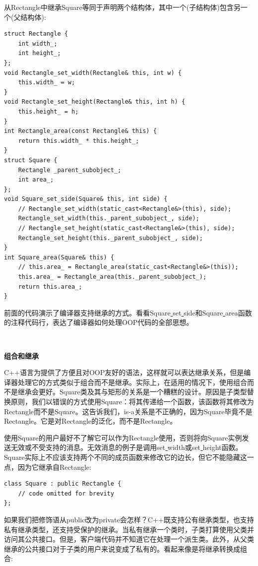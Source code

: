 从Rectangle中继承Square等同于声明两个结构体，其中一个(子结构体)包含另一个(父结构体): \par

\begin{lstlisting}[caption={}]
struct Rectangle {
	int width_;
	int height_;
};
void Rectangle_set_width(Rectangle& this, int w) {
	this.width_ = w;
}
void Rectangle_set_height(Rectangle& this, int h) {
	this.height_ = h;
}
int Rectangle_area(const Rectangle& this) {
	return this.width_ * this.height_;
}
struct Square {
	Rectangle _parent_subobject_;
	int area_;
};
void Square_set_side(Square& this, int side) {
	// Rectangle_set_width(static_cast<Rectangle&>(this), side);
	Rectangle_set_width(this._parent_subobject_, side);
	// Rectangle_set_height(static_cast<Rectangle&>(this), side);
	Rectangle_set_height(this._parent_subobject_, side);
}
int Square_area(Square& this) {
	// this.area_ = Rectangle_area(static_cast<Rectangle&>(this));
	this.area_ = Rectangle_area(this._parent_subobject_);
	return this.area_;
}
\end{lstlisting}

前面的代码演示了编译器支持继承的方式。看看Square\underline{ }set\underline{ }side和Square\underline{ }area函数的注释代码行，表达了编译器如何处理OOP代码的全部思想。 \par

\noindent\textbf{}\ \par
\textbf{组合和继承} \ \par
C++语言为提供了方便且对OOP友好的语法，这样就可以表达继承关系，但是编译器处理它的方式类似于组合而不是继承。实际上，在适用的情况下，使用组合而不是继承会更好。Square类及其与矩形的关系是一个糟糕的设计。原因是子类型替换原则，我们以错误的方式使用Square：将其传递给一个函数，该函数将其修改为Rectangle而不是Square。这告诉我们，is-a关系是不正确的，因为Square毕竟不是Rectangle。它是对Rectangle的泛化，而不是Rectangle。\par
使用Square的用户最好不了解它可以作为Rectangle使用，否则将向Square实例发送无效或不受支持的消息。无效消息的例子是调用set\underline{ }width或set\underline{ }height函数。Square实际上不应该支持两个不同的成员函数来修改它的边长，但它不能隐藏这一点，因为它继承自Rectangle: \par

\begin{lstlisting}[caption={}]
class Square : public Rectangle {
	// code omitted for brevity
};
\end{lstlisting}

如果我们把修饰语从public改为private会怎样？C++既支持公有继承类型，也支持私有继承类型，还支持受保护的继承。当私有继承一个类时，子类打算使用父类并访问其公共接口。但是，客户端代码并不知道它在处理一个派生类。此外，从父类继承的公共接口对于子类的用户来说变成了私有的。看起来像是将继承转换成组合:\par

